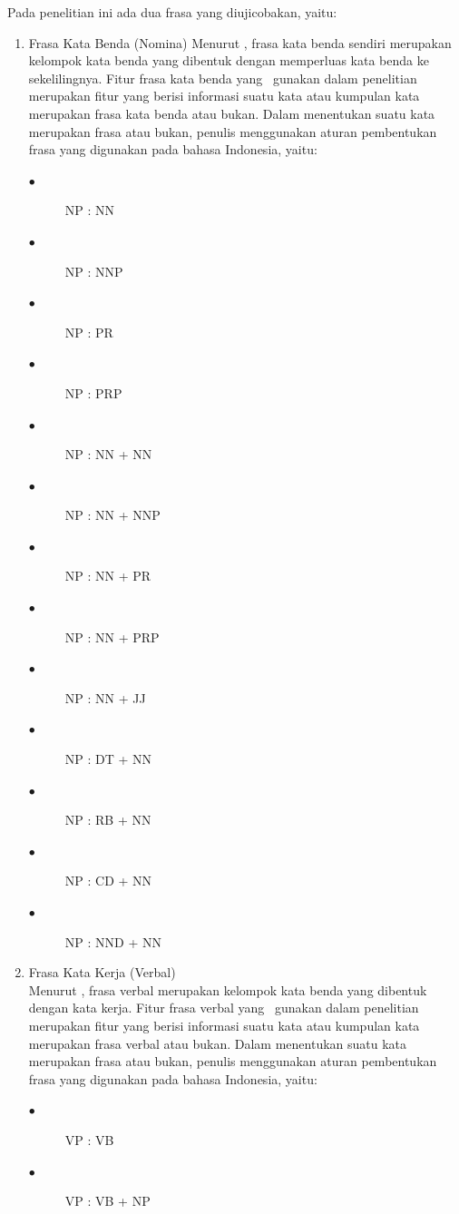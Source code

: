\begin{enumerate}
	Pada penelitian ini ada dua frasa yang diujicobakan, yaitu:
	\begin{enumerate}
		\item Frasa Kata Benda (Nomina)
		Menurut \cite{hs2005bahasa}, frasa kata benda sendiri merupakan kelompok kata benda yang dibentuk dengan memperluas kata benda ke sekelilingnya. Fitur frasa kata benda yang \saya~gunakan dalam penelitian merupakan fitur yang berisi informasi suatu kata atau kumpulan kata merupakan frasa kata benda atau bukan. Dalam menentukan suatu kata merupakan frasa atau bukan, penulis menggunakan aturan pembentukan frasa yang digunakan pada bahasa Indonesia, yaitu:
		\begin{description}
			\item[$\bullet$] NP : NN
			\item[$\bullet$] NP : NNP
			\item[$\bullet$] NP : PR
			\item[$\bullet$] NP : PRP
			\item[$\bullet$] NP : NN + NN
			\item[$\bullet$] NP : NN + NNP
			\item[$\bullet$] NP : NN + PR
			\item[$\bullet$] NP : NN + PRP
			\item[$\bullet$] NP : NN + JJ
			\item[$\bullet$] NP : DT + NN
			\item[$\bullet$] NP : RB + NN
			\item[$\bullet$] NP : CD + NN
			\item[$\bullet$] NP : NND + NN
		\end{description}
		
		\item Frasa Kata Kerja (Verbal)\\
		Menurut \cite{hs2005bahasa}, frasa verbal merupakan kelompok kata benda yang dibentuk dengan kata kerja. Fitur frasa verbal yang \saya~gunakan dalam penelitian merupakan fitur yang berisi informasi suatu kata atau kumpulan kata merupakan frasa verbal atau bukan. Dalam menentukan suatu kata merupakan frasa atau bukan, penulis menggunakan aturan pembentukan frasa yang digunakan pada bahasa Indonesia, yaitu:
		\begin{description}
			\item[$\bullet$] VP : VB
			\item[$\bullet$] VP : VB + NP
		\end{description}
	\end{enumerate}
	

\end{enumerate}

